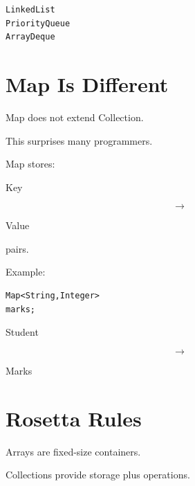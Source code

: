 \documentclass[11pt,a4paper]{book}
\begin{document}
\begin{verbatim}
LinkedList
PriorityQueue
ArrayDeque
\end{verbatim}


\section{Map Is Different}

Map does not extend Collection.


This surprises many programmers.


Map stores:


Key

\[
\rightarrow
\]

Value

pairs.


Example:

\begin{verbatim} 
Map<String,Integer>
marks;
\end{verbatim}


Student

\[
\rightarrow
\]

Marks


\section{Rosetta Rules}

\begin{rosettarule}

Arrays are fixed-size containers.

\end{rosettarule}


\begin{rosettarule}

Collections provide storage
plus operations.

\end{rosettarule}
\end{document}
